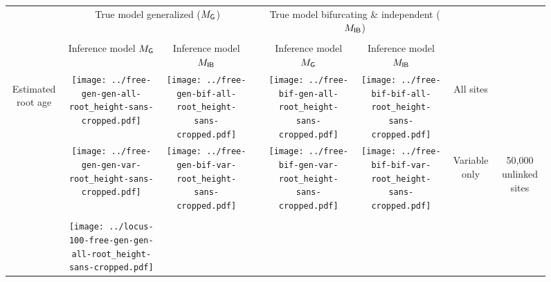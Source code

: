 \documentclass[border=10pt,varwidth=30cm]{standalone}
\newcommand{\genmodel}{\ensuremath{M_{\textrm{\sffamily G}}}\xspace}
\newcommand{\bimodel}{\ensuremath{M_{\textrm{\sffamily IB}}}\xspace}
\begin{document}
\begin{figure}
    \setlength\arrayrulewidth{2pt}
    \centering
    \begin{tabular}{@{}cccccccc@{}}
        & \multicolumn{2}{c}{\LARGE True model generalized (\genmodel)}
        &
        & \multicolumn{2}{c}{\LARGE True model bifurcating \& independent (\bimodel)}
        &
        & \\[1ex]
        \cline{2-3}\cline{5-6}
        & & & & & & & \\
        & \multirow{1}{0.19\textwidth}{\centering\Large Inference model \genmodel}
        & \multirow{1}{0.19\textwidth}{\centering\Large Inference model \bimodel}
        &
        & \multirow{1}{0.19\textwidth}{\centering\Large Inference model \genmodel}
        & \multirow{1}{0.19\textwidth}{\centering\Large Inference model \bimodel}
        &
        & \\[4ex]
        \multirow{5}{*}[-8em]{\begin{sideways}\Large Estimated root age\end{sideways}}
        & \texttt{[image: ../free-gen-gen-all-root\_height-sans-cropped.pdf]}
        & \texttt{[image: ../free-gen-bif-all-root\_height-sans-cropped.pdf]}
        &
        & \texttt{[image: ../free-bif-gen-all-root\_height-sans-cropped.pdf]}
        & \texttt{[image: ../free-bif-bif-all-root\_height-sans-cropped.pdf]}
        & \multicolumn{1}{c|}{\multirow{1}{*}[9em]{\begin{sideways}\Large All sites\end{sideways}}}
        & \\
        & \texttt{[image: ../free-gen-gen-var-root\_height-sans-cropped.pdf]}
        & \texttt{[image: ../free-gen-bif-var-root\_height-sans-cropped.pdf]}
        &
        & \texttt{[image: ../free-bif-gen-var-root\_height-sans-cropped.pdf]}
        & \texttt{[image: ../free-bif-bif-var-root\_height-sans-cropped.pdf]}
        & \multicolumn{1}{c|}{\multirow{1}{*}[10em]{\begin{sideways}\Large Variable only\end{sideways}}}
        & \multirow{2}{*}[19em]{\begin{sideways}\LARGE 50,000 unlinked sites\end{sideways}} \\
        & & & & & & & \\
        & \texttt{[image: ../locus-100-free-gen-gen-all-root\_height-sans-cropped.pdf]}

\end{tabular}
\end{figure}
\end{document}
